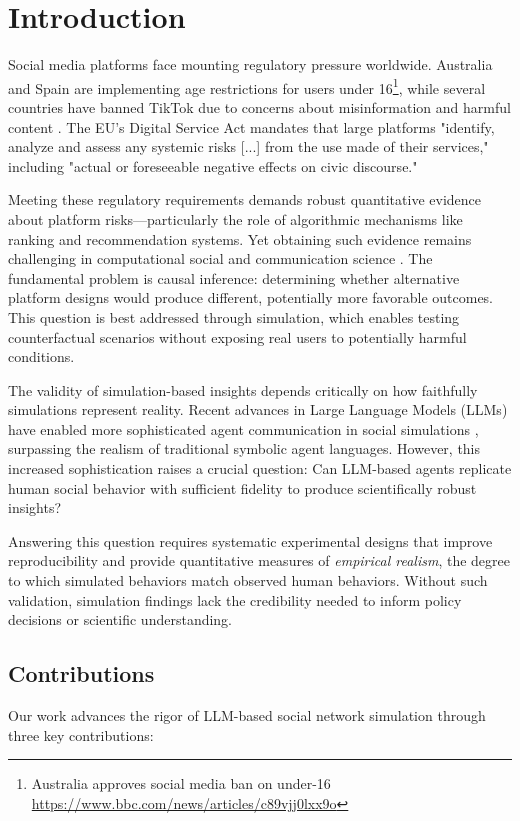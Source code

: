 \section{Introduction}
Social media platforms face mounting regulatory pressure worldwide. Australia and Spain are implementing age restrictions for users under 16\footnote{Australia approves social media ban on under-16 \url{https://www.bbc.com/news/articles/c89vjj0lxx9o}}, while several countries have banned TikTok due to concerns about misinformation \cite{basch2021global} and harmful content \cite{weimann2023research}. The EU's Digital Service Act mandates that large platforms "identify, analyze and assess any systemic risks [...] from the use made of their services," including "actual or foreseeable negative effects on civic discourse."

Meeting these regulatory requirements demands robust quantitative evidence about platform risks—particularly the role of algorithmic mechanisms like ranking and recommendation systems. Yet obtaining such evidence remains challenging in computational social and communication science \cite{wang2016understanding}. The fundamental problem is causal inference: determining whether alternative platform designs would produce different, potentially more favorable outcomes. This question is best addressed through simulation, which enables testing counterfactual scenarios without exposing real users to potentially harmful conditions.

The validity of simulation-based insights depends critically on how faithfully simulations represent reality. Recent advances in Large Language Models (LLMs) have enabled more sophisticated agent communication in social simulations \cite{chuang2024simulating}, surpassing the realism of traditional symbolic agent languages. However, this increased sophistication raises a crucial question: Can LLM-based agents replicate human social behavior with sufficient fidelity to produce scientifically robust insights?

Answering this question requires systematic experimental designs that improve reproducibility and provide quantitative measures of \textit{empirical realism}, the degree to which simulated behaviors match observed human behaviors. Without such validation, simulation findings lack the credibility needed to inform policy decisions or scientific understanding.

\subsection*{Contributions}
Our work advances the rigor of LLM-based social network simulation through three key contributions:


